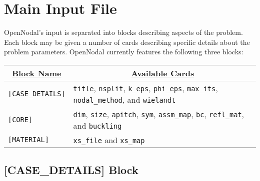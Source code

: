 \section{Main Input File}

OpenNodal's input is separated into blocks describing aspects of the problem.
Each block may be given a number of cards describing specific details about the problem parameters.
OpenNodal currently features the following three blocks:
\begin{table}[H]
\centering
  \begin{tabular}{|l|l|}
    \hline
    \multicolumn{1}{|c|}{{\ul \textbf{Block Name}}} & \multicolumn{1}{c|}{{\ul \textbf{Available Cards}}} \\ \hline
    \verb"[CASE_DETAILS]" & \verb"title", \verb"nsplit", \verb"k_eps", \verb"phi_eps", \verb"max_its", \verb"nodal_method", and \verb"wielandt" \\ \hline
    \verb"[CORE]" & \verb"dim", \verb"size", \verb"apitch", \verb"sym", \verb"assm_map", \verb"bc", \verb"refl_mat", and \verb"buckling" \\ \hline
    \verb"[MATERIAL]" & \verb"xs_file" and \verb"xs_map" \\ \hline
  \end{tabular}
\end{table}

\subsection{[CASE\_DETAILS] Block}

